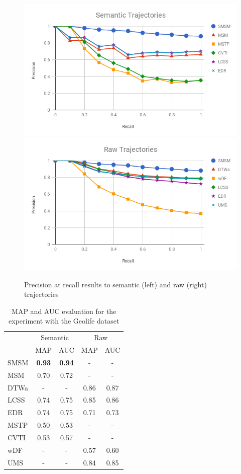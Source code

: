 \documentclass[12pt]{article}
\begin{document}
\begin{figure}[ht!]
\centerline{
\centering
\includegraphics[width=.55\textwidth]{Images/P_R-chart_Geolife.png}
\includegraphics[width=.55\textwidth]{Images/P_R-chart_Geolife-raw.png}
}
\caption{Precision at recall results to semantic (left) and raw (right) trajectories}
\label{fig:geolife_precision_recall}
\end{figure}

\begin{table}[ht!]
  \scriptsize
  \centering
  \begin{tabular}{|l|c|c|c|c|}
  	\hline
 & \multicolumn{2}{c}{Semantic}& \multicolumn{2}{|c|}{Raw}\\
 	\cline{2-5}
 & MAP & AUC& MAP & AUC\\
  	\hline
SMSM & \textbf{0.93} & \textbf{0.94} & - & -\\
 MSM & 0.70 & 0.72 & - & -\\
DTWa & - & - & 0.86 & 0.87\\
LCSS & 0.74 & 0.75 & 0.85 & 0.86\\
 EDR & 0.74 & 0.75 & 0.71 & 0.73\\
MSTP & 0.50 & 0.53 & - & -\\
CVTI & 0.53 & 0.57 & - & -\\
 wDF & - & - & 0.57 & 0.60\\
 UMS & - & - & 0.84 & 0.85\\
    \hline
  \end{tabular}
  \caption{MAP and AUC evaluation for the experiment with the Geolife dataset}
  \label{tab:geolife_measures_map_auc}
\end{table}
\end{document}
